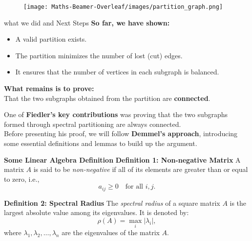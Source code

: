\documentclass[aspectratio=169]{beamer}
\begin{document}
\begin{frame}
\begin{figure}[H]
    \centering
    \texttt{[image: Maths-Beamer-Overleaf/images/partition\_graph.png]}
    \label{fig:partition_graph}
\end{figure}
\end{frame}


\begin{frame}{what we did and Next Steps}
    \textbf{So far, we have shown:}
    \begin{itemize}
        \item A valid partition exists.
        \item The partition minimizes the number of lost (cut) edges.
        \item It ensures that the number of vertices in each subgraph is balanced.
    \end{itemize}
    
    \vspace{0.5cm}
    \textbf{What remains is to prove:} \\
    That the two subgraphs obtained from the partition are \textbf{connected}.

    \vspace{0.5cm}
    One of \textbf{Fiedler's key contributions} was proving that the two subgraphs formed through spectral partitioning are always connected. \\
    
    Before presenting his proof, we will follow \textbf{Demmel's approach}, introducing some essential definitions and lemmas to build up the argument.
\end{frame}


\begin{frame}{\textbf{Some Linear Algebra Definition }}
 \textbf{\large Definition 1: Non-negative Matrix} 
  A matrix $A$ is said to be \textit{non-negative} if all of its elements are greater than or equal to zero, i.e.,
  \[    a_{ij} \geq 0 \quad \text{for all } i, j.  \]
  
  
  
  \textbf{\large Definition 2: Spectral Radius}  
  The \textit{spectral radius} of a square matrix $A$ is the largest absolute value among its eigenvalues. It is denoted by:
  \[    \rho(A) = \max_i |\lambda_i|,  \]
  where $\lambda_1, \lambda_2, \ldots, \lambda_n$ are the eigenvalues of the matrix $A$.  
\end{frame}
\end{document}
